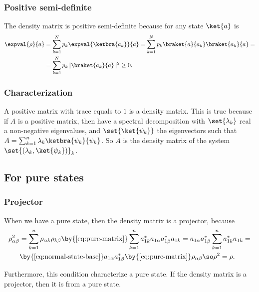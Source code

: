 \subsubsection{Positive semi-definite}
The density matrix is positive semi-definite because for any state $\ket{a}$ is 
\begin{equation*}
\begin{split}
\expval{\rho}{a} &= \sum_{k=1}^N p_k \expval{\ketbra{a_k}}{a}=\sum_{k=1}^N p_k \braket{a}{a_k}\braket{a_k}{a}=\\
&= \sum_{k=1}^N p_k \|\braket{a_k}{a}\|^2\geq 0.
\end{split}
\end{equation*}

\subsubsection{Characterization}\label{subsubsec:characterization-density-matrix}
A positive matrix with trace equals to $1$ is a density matrix.
This is true because if $A$ is a positive matrix, then have a spectral decomposition with $\set{\lambda_k}$ real a non-negative eigenvalues, and $\set{\ket{\psi_k}}$ the eigenvectors such that $A=\sum_{k=1}^n \lambda_k \ketbra{\psi_k}{\psi_k}$.
So $A$ is the density matrix of the system $\set{(\lambda_k, \ket{\psi_k})}_k$.

\subsection{For pure states}
\subsubsection{Projector}
When we have a pure state, then the density matrix is a projector, because
\begin{equation}
        \label{eq:pure-matrix-projector}
    \begin{split}
        \rho^2_{\alpha\beta}&=\sum_{k=1}^{n}\rho_{\alpha k}\rho_{k \beta}\by{\ref{eq:pure-matrix}}\sum_{k=1}^n a_{1k}^* a_{1 \alpha}a_{1\beta}^* a_{1 k}=a_{1 \alpha}a_{1\beta}^*\sum_{k=1}^n a_{1k}^* a_{1 k}=\\
        &\by{\ref{eq:normal-state-base}}a_{1 \alpha}a_{1\beta}^*\by{\ref{eq:pure-matrix}}\rho_{\alpha\beta}\so \rho^2=\rho.
    \end{split}
\end{equation}

Furthermore, this condition characterize a pure state.
If the density matrix is a projector, then it is from a pure state.

